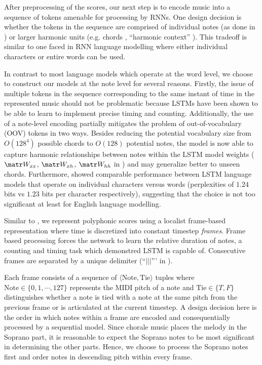 After preprocessing of the scores, our next step is to encode music into a
sequence of tokens amenable for processing by RNNs. One design decision is
whether the tokens in the sequence are comprised of individual notes (as done
in \citep{mozer1994neural,franklin2004recurrent,sturm2016music}) or larger
harmonic units (e.g. chords \citep{Eck2002,Boulanger-Lewandowski2012},
``harmonic context'' \citep{Allan2005}). This tradeoff is similar to one faced
in RNN language modelling where either individual characters or entire words
can be used.

In contrast to most language models which operate at the word level, we choose
to construct our models at the note level for several reasons.
Firstly, the issue of multiple tokens in the sequence corresponding to the same
instant of time in the represented music should not be problematic because
LSTMs have been shown to be able to learn to implement precise timing and
counting\cite{gers2002learning}. Additionally, the use of a note-level encoding
partially mitigates the problem of out-of-vocabulary (OOV) tokens in two ways.
Besides reducing the potential vocabulary size from $O(128^4)$ possible chords
to $O(128)$ potential notes, the model is now able to capture harmonic
relationships between notes within the LSTM model weights ($\W_{xx}$,
$\W_{xh}$, $\W_{hh}$ in ) and may generalize better to unseen
chords. Furthermore, \citet{graves2013generating} showed comparable performance
between LSTM language models that operate on individual characters versus words
(perplexities of $1.24$ bits vs $1.23$ bits per character respectively),
suggesting that the choice is not too significant at least for English language
modelling.


Similar to \citep{todd1989connectionist}, we represent polyphonic scores using
a localist frame-based representation where time is discretized into constant
timestep \emph{frames}. Frame based processing forces the network to learn the
relative duration of notes, a counting and timing task which
\citep{gers2002learning} demonstred LSTM is capable of. Consecutive frames are
separated by a unique delimiter (``$|||$''' in ).

Each frame consists of a sequence of $\langle \text{Note}, \text{Tie} \rangle$
tuples where $\text{Note} \in \{0,1,\cdots,127\}$ represents the MIDI pitch of
a note and $\text{Tie} \in \{T,F\}$ distinguishes whether a note is tied with a
note at the same pitch from the previous frame or is articulated at the current
timestep. A design decision here is the order in which notes within a frame are
encoded and consequentially processed by a sequential model. Since chorale
music places the melody in the Soprano part, it is reasonable to expect the
Soprano notes to be most significant in determining the other parts. Hence, we
choose to process the Soprano notes first and order notes in descending pitch
within every frame.

